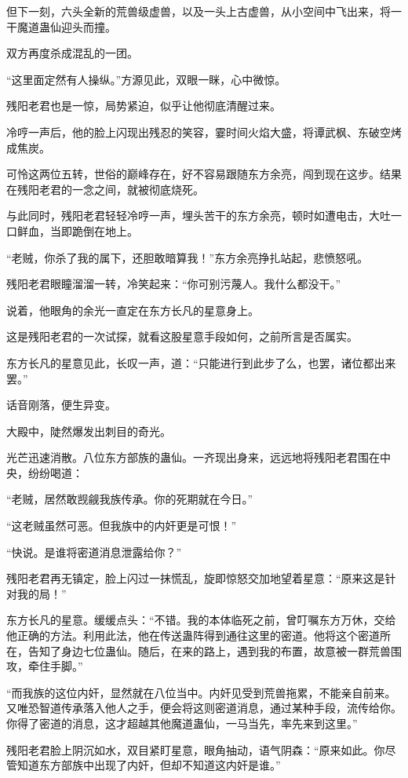 \begin{this_body}
但下一刻，六头全新的荒兽级虚兽，以及一头上古虚兽，从小空间中飞出来，将一干魔道蛊仙迎头而撞。

双方再度杀成混乱的一团。

“这里面定然有人操纵。”方源见此，双眼一眯，心中微惊。

残阳老君也是一惊，局势紧迫，似乎让他彻底清醒过来。

冷哼一声后，他的脸上闪现出残忍的笑容，霎时间火焰大盛，将谭武枫、东破空烤成焦炭。

可怜这两位五转，世俗的巅峰存在，好不容易跟随东方余亮，闯到现在这步。结果在残阳老君的一念之间，就被彻底烧死。

与此同时，残阳老君轻轻冷哼一声，埋头苦干的东方余亮，顿时如遭电击，大吐一口鲜血，当即跪倒在地上。

“老贼，你杀了我的属下，还胆敢暗算我！”东方余亮挣扎站起，悲愤怒吼。

残阳老君眼瞳溜溜一转，冷笑起来：“你可别污蔑人。我什么都没干。”

说着，他眼角的余光一直定在东方长凡的星意身上。

这是残阳老君的一次试探，就看这股星意手段如何，之前所言是否属实。

东方长凡的星意见此，长叹一声，道：“只能进行到此步了么，也罢，诸位都出来罢。”

话音刚落，便生异变。

大殿中，陡然爆发出刺目的奇光。

光芒迅速消散。八位东方部族的蛊仙。一齐现出身来，远远地将残阳老君围在中央，纷纷喝道：

“老贼，居然敢觊觎我族传承。你的死期就在今日。”

“这老贼虽然可恶。但我族中的内奸更是可恨！”

“快说。是谁将密道消息泄露给你？”

残阳老君再无镇定，脸上闪过一抹慌乱，旋即惊怒交加地望着星意：“原来这是针对我的局！”

东方长凡的星意。缓缓点头：“不错。我的本体临死之前，曾叮嘱东方万休，交给他正确的方法。利用此法，他在传送蛊阵得到通往这里的密道。他将这个密道所在，告知了身边七位蛊仙。随后，在来的路上，遇到我的布置，故意被一群荒兽围攻，牵住手脚。”

“而我族的这位内奸，显然就在八位当中。内奸见受到荒兽拖累，不能亲自前来。又唯恐智道传承落入他人之手，便会将这则密道消息，通过某种手段，流传给你。你得了密道的消息，这才超越其他魔道蛊仙，一马当先，率先来到这里。”

残阳老君脸上阴沉如水，双目紧盯星意，眼角抽动，语气阴森：“原来如此。你尽管知道东方部族中出现了内奸，但却不知道这内奸是谁。”


\end{this_body}

